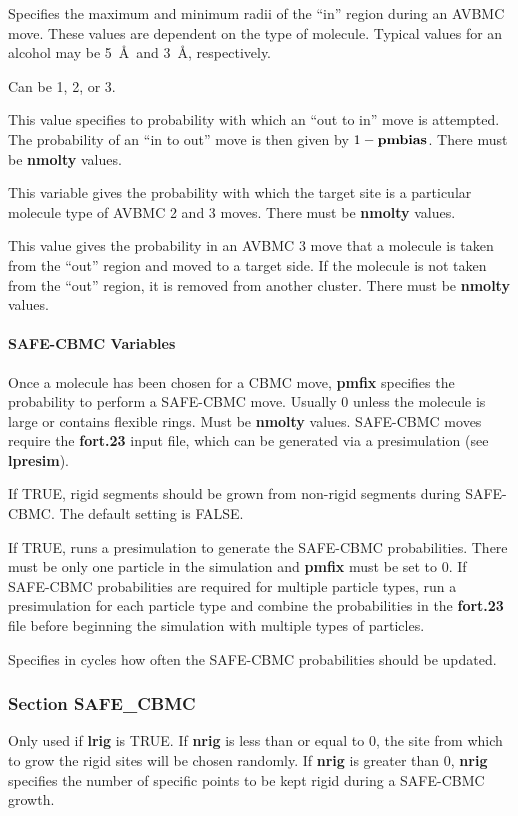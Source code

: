 \documentclass[12pt,letterpaper]{article}
\begin{document}
 Specifies the maximum and
minimum radii of the ``in'' region during an AVBMC move.
These values are dependent on the type of molecule. Typical
values for an alcohol may be 5~\AA~and 3~\AA, respectively.

 Can be 1, 2, or 3.

 This value specifies to probability
with which an ``out to in'' move is attempted. The
probability of an ``in to out'' move is then given by $1 -
{\bf pmbias}$. There must be {\bf nmolty} values.

 This variable gives the probability
with which the target site is a particular molecule type of
AVBMC 2 and 3 moves. There must be {\bf nmolty} values.

 This value gives the probability in
an AVBMC 3 move that a molecule is taken from the ``out''
region and moved to a target side. If the molecule is not
taken from the ``out'' region, it is removed from another
cluster. There must be {\bf nmolty} values.

\paragraph{SAFE-CBMC Variables}

 Once a molecule has been chosen for a
CBMC move, {\bf pmfix} specifies the probability to perform
a SAFE-CBMC move. Usually 0 unless the molecule is large or
contains flexible rings. Must be {\bf nmolty} values.
SAFE-CBMC moves require the {\bf fort.23} input file, which
can be generated via a presimulation (see {\bf lpresim}).

 If TRUE, rigid segments should be grown
from non-rigid segments during SAFE-CBMC. The default
setting is FALSE.

 If TRUE, runs a presimulation to
generate the SAFE-CBMC probabilities. There must be only one
particle in the simulation and {\bf pmfix} must be set to 0.
If SAFE-CBMC probabilities are required for multiple
particle types, run a presimulation for each particle type
and combine the probabilities in the {\bf fort.23} file
before beginning the simulation with multiple types of
particles.

 Specifies in cycles how often the
SAFE-CBMC probabilities should be updated.

\subsubsection{Section \textbf{SAFE\_CBMC}}
 Only used if {\bf lrig} is TRUE. If
{\bf nrig} is less than or equal to 0, the site from which
to grow the rigid sites will be chosen randomly. If
{\bf nrig} is greater than 0, {\bf nrig} specifies the
number of specific points to be kept rigid during a
SAFE-CBMC growth.
\end{document}
